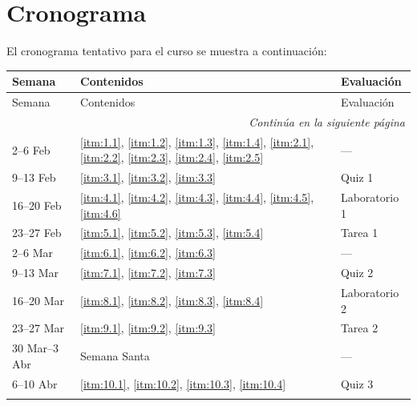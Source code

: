 \section{Cronograma}

El cronograma tentativo para el curso se muestra a continuación:

\begin{longtable}{p{3.2cm}p{6.6cm}p{2.8cm}}
\toprule
Semana & Contenidos & Evaluación \\
\midrule
\endfirsthead

\toprule
Semana & Contenidos & Evaluación \\
\midrule
\endhead

\midrule
\multicolumn{3}{r}{\textit{Continúa en la siguiente página}} \\
\endfoot

\bottomrule
\endlastfoot

2--6 Feb &
\ref{itm:1.1}, \ref{itm:1.2}, \ref{itm:1.3}, \ref{itm:1.4},
\ref{itm:2.1}, \ref{itm:2.2}, \ref{itm:2.3}, \ref{itm:2.4}, \ref{itm:2.5}
&
---
\\
\addlinespace

9--13 Feb &
\ref{itm:3.1}, \ref{itm:3.2}, \ref{itm:3.3}
&
Quiz 1
\\
\addlinespace

16--20 Feb &
\ref{itm:4.1}, \ref{itm:4.2}, \ref{itm:4.3}, \ref{itm:4.4}, \ref{itm:4.5}, \ref{itm:4.6}
&
Laboratorio 1
\\
\addlinespace

23--27 Feb &
\ref{itm:5.1}, \ref{itm:5.2}, \ref{itm:5.3}, \ref{itm:5.4}
&
Tarea 1
\\
\addlinespace

2--6 Mar &
\ref{itm:6.1}, \ref{itm:6.2}, \ref{itm:6.3}
&
---
\\
\addlinespace

9--13 Mar &
\ref{itm:7.1}, \ref{itm:7.2}, \ref{itm:7.3}
&
Quiz 2
\\
\addlinespace

16--20 Mar &
\ref{itm:8.1}, \ref{itm:8.2}, \ref{itm:8.3}, \ref{itm:8.4}
&
Laboratorio 2
\\
\addlinespace

23--27 Mar &
\ref{itm:9.1}, \ref{itm:9.2}, \ref{itm:9.3}
&
Tarea 2
\\
\addlinespace

30 Mar--3 Abr &
Semana Santa
&
---
\\
\addlinespace

6--10 Abr &
\ref{itm:10.1}, \ref{itm:10.2}, \ref{itm:10.3}, \ref{itm:10.4}
&
Quiz 3
\\
\addlinespace


\end{longtable}
